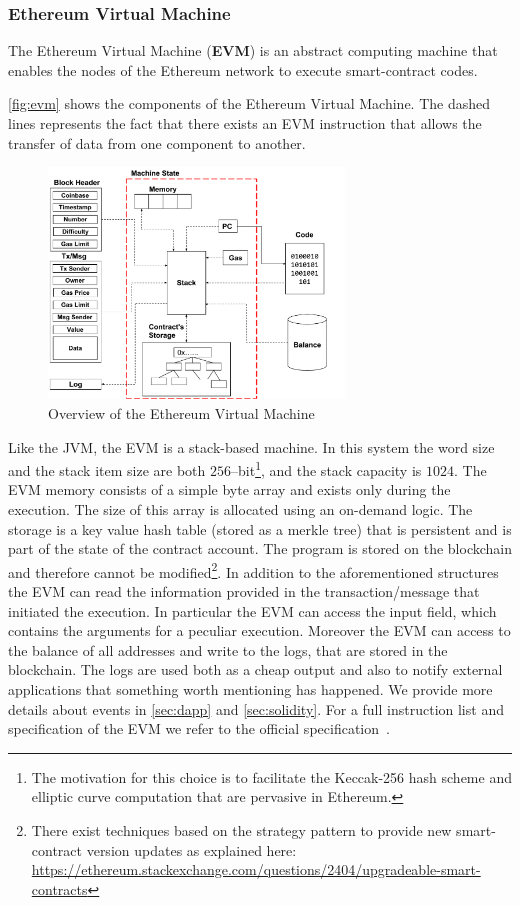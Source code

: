 \subsubsection{Ethereum Virtual Machine}
\label{sec:evm}
The Ethereum Virtual Machine (\textbf{EVM}) is an abstract computing machine
that enables the nodes of the Ethereum network to execute smart-contract
codes.


\autoref{fig:evm} shows the components of the Ethereum Virtual Machine.
The dashed lines represents the fact that there exists an EVM instruction
that allows the transfer of data from one component to another.
\begin{figure}
	\begin{center}
		\includegraphics[width=0.7\textwidth]
        {./res/img/evm-overview.pdf}
	\end{center}
	\caption{Overview of the Ethereum Virtual Machine}
	\label{fig:evm}
\end{figure}
Like the JVM, the EVM is a stack-based machine. In this system the word size
and the stack item size are both $256$--bit\footnote{The motivation
for this choice is to facilitate the Keccak-256 hash scheme and elliptic
curve computation that are pervasive in Ethereum.},
and the stack capacity is $1024$.
The EVM memory consists of a simple byte array and exists only during the
execution. The size of this array is allocated using an on-demand logic.
The storage is a key value hash table (stored as a merkle tree) that is
persistent and is part of the state of the contract account.
The program is stored on the blockchain and therefore cannot
be modified\footnote{There exist
techniques based on the strategy pattern to provide new smart-contract version
updates as explained here:
\url{https://ethereum.stackexchange.com/questions/2404/upgradeable-smart-contracts}}.
In addition to the aforementioned structures the EVM can read the information
provided in the transaction/message that initiated the execution. In particular
the EVM can access the input field, which contains the arguments for a peculiar
execution.
Moreover the EVM can access to the balance of all addresses and write to the
logs, that are stored in the blockchain. The logs are used both as a cheap
output and also to notify external applications that something worth mentioning
has happened. We provide more details about events in \autoref{sec:dapp} 
and \autoref{sec:solidity}.
For a full instruction list and specification of the EVM we refer to the 
official specification~\cite[Appendix H]{wood2018ethereum}.


